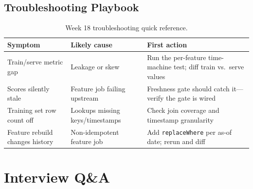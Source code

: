 \subsection{Troubleshooting Playbook}
\begin{table}[H]
\centering
\small
\begin{tabular}{@{}p{3.6cm}p{4.2cm}p{4.8cm}@{}}
\toprule
\textbf{Symptom} & \textbf{Likely cause} & \textbf{First action} \\
\midrule
Train/serve metric gap & Leakage or skew & Run the per-feature time-machine test; diff train vs.\ serve values \\
Scores silently stale & Feature job failing upstream & Freshness gate should catch it---verify the gate is wired \\
Training set row count off & Lookups missing keys/timestamps & Check join coverage and timestamp granularity \\
Feature rebuild changes history & Non-idempotent feature job & Add \texttt{replaceWhere} per as-of date; rerun and diff \\
\bottomrule
\end{tabular}
\caption{Week 18 troubleshooting quick reference.}
\label{tab:ch18-trouble}
\end{table}

\section{Interview Q\&A}
